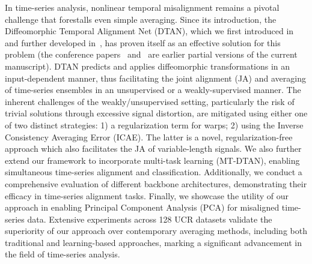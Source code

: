 In time-series analysis, nonlinear temporal misalignment remains a pivotal challenge that forestalls even
simple averaging. Since its introduction, the Diffeomorphic Temporal Alignment Net (DTAN), which we first introduced in~\cite{Shapira:NIPS:2019:DTAN} and further developed in~\cite{Shapira:ICML:2023:RFDTAN}, 
has proven itself as an effective solution for this problem (the conference papers~\cite{Shapira:NIPS:2019:DTAN} and~\cite{Shapira:ICML:2023:RFDTAN} are earlier partial versions of the current manuscript). DTAN predicts and applies diffeomorphic transformations in an input-dependent manner, thus facilitating the joint alignment (JA) and averaging of time-series ensembles in an unsupervised or a weakly-supervised manner. The inherent challenges of the weakly/unsupervised setting, particularly the risk of trivial solutions through excessive signal distortion, are mitigated using either one of two distinct strategies: 1) a regularization term for warps; 2) using the Inverse Consistency Averaging Error (ICAE).
The latter is a novel, regularization-free approach which also facilitates the JA of variable-length signals.
We also further extend our framework to incorporate multi-task learning (MT-DTAN), enabling simultaneous time-series alignment and classification. Additionally, we conduct a comprehensive evaluation of different backbone architectures, demonstrating their efficacy in time-series alignment tasks. Finally, we showcase the utility of our approach in enabling Principal Component Analysis (PCA) for misaligned time-series data. Extensive experiments across 128 UCR datasets validate the superiority of our approach over contemporary averaging methods, including both traditional and learning-based approaches, marking a significant advancement in the field of time-series analysis.